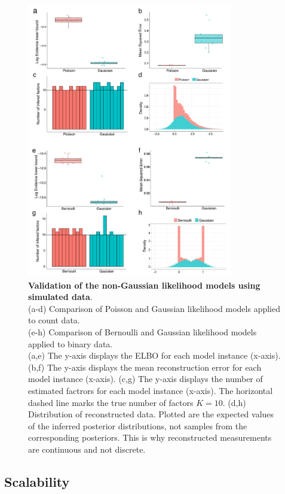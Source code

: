 \begin{figure}[H]
	\centering 	
	\includegraphics[width=0.8\textwidth]{MOFA_nongaussian}
	\caption{\textbf{Validation of the non-Gaussian likelihood models using simulated data}.\\
	(a-d) Comparison of Poisson and Gaussian likelihood models applied to count data.\\
	(e-h) Comparison of Bernoulli and Gaussian likelihood models applied to binary data.\\
	(a,e) The y-axis displays the ELBO for each model instance (x-axis). (b,f) The y-axis displays the mean reconstruction error for each model instance (x-axis). (c,g) The y-axis displays the number of estimated factrors for each model instance (x-axis). The horizontal dashed line marks the true number of factors $K=10$. (d,h) Distribution of reconstructed data. Plotted are the expected values of the inferred posterior distributions, not samples from the corresponding posteriors. This is why reconstructed measurements are continuous and not discrete.
	}
	\label{fig:MOFA_nongaussian}
\end{figure}


\subsection{Scalability}

